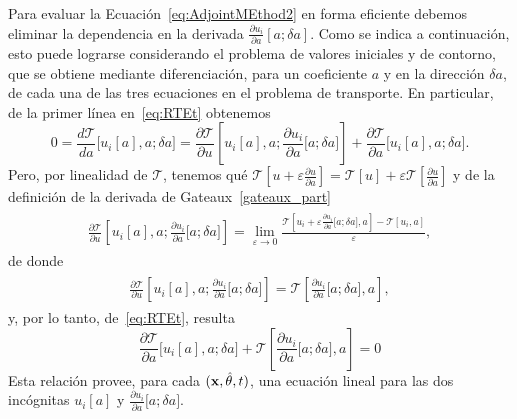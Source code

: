 Para evaluar la Ecuación~\eqref{eq:AdjointMEthod2} en forma eficiente 
debemos eliminar la dependencia en la derivada $\frac{\partial u_i}{\partial a}[a;\delta a]$. Como se indica a continuación, 
esto puede lograrse considerando el problema de valores iniciales 
y de contorno, que se obtiene mediante diferenciación, para un coeficiente 
$a$ y en la dirección $\delta a$, de cada una de las tres ecuaciones en el problema de transporte. 
En particular, de la primer línea en~\eqref{eq:RTEt} obtenemos
\begin{equation}
  0 = \frac{d\mathcal{T}}{da}\big[u_i[a],a;\delta a
  \big]=\frac{\partial \mathcal{T}}{\partial u}
  \left[u_i[a],a;\frac{\partial u_i}{\partial a}\big[a;\delta
    a\big]\right] + \frac{\partial \mathcal{T}}{\partial
    a}\big[u_i[a],a; \delta a \big].
\label{eq:RRTEder}
\end{equation}
Pero, por linealidad de $\mathcal{T}$, tenemos qué $\mathcal{T}[u+\varepsilon \frac{\partial u}{\partial a}]=\mathcal{T}[u]+\varepsilon\mathcal{T}[\frac{\partial u}{\partial a}]$ y 
de la definición de la derivada de Gateaux~\eqref{gateaux_part}
\begin{equation}
\begin{split}
\begin{aligned}
\frac{\partial \mathcal{T}}{\partial u}\left[u_i[a],a;\frac{\partial u_i}{\partial a}\big[a;\delta a\big]\right]= \lim_{\varepsilon \to 0} \frac{\mathcal{T}[u_i +\varepsilon\frac{\partial u_i}{\partial a}\big[a;\delta a\big],a]-\mathcal{T}[u_i,a]}{\varepsilon},
\end{aligned}
\end{split}
\label{eq:linealidadT}
\end{equation}
de donde
\begin{equation}
\begin{split}
\begin{aligned}
\frac{\partial \mathcal{T}}{\partial u}\left[u_i[a],a;\frac{\partial u_i}{\partial a}\big[a;\delta a\big]\right]=
\mathcal{T}\left[\frac{\partial u_i}{\partial a}\big[a;\delta a\big],a\right],
\end{aligned}
\end{split}
\label{eq:RRTEdet3}
\end{equation}
y, por lo tanto, de~\eqref{eq:RTEt}, resulta
\begin{equation}
\frac{\partial \mathcal{T}}{\partial a}\big[u_i[a],a;\delta a\big] + 
\mathcal{T}\left[ \frac{\partial u_i}{\partial a}\big[a;\delta a\big],a \right]=0
\label{eq:RRTEdet4}
\end{equation}
Esta relación provee, para cada $(\mathbf{x},\hat{\theta},t)$, una ecuación 
lineal para las dos incógnitas $u_i[a]$ y 
$\frac{\partial u_i}{\partial a}\big[a;\delta a\big]$.

